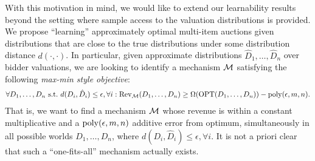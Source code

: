 With this motivation in mind, we would like to extend our learnability results beyond the setting where sample access to the valuation distributions is provided. We propose ``learning'' approximately optimal multi-item auctions given distributions that are close to the true distributions under some distribution distance $d(\cdot,\cdot)$. In particular, given approximate distributions $\hat{D}_1,\ldots,\hat{D}_n$ over bidder valuations, we are looking to identify a mechanism $\cal M$ satisfying the following {\em max-min style objective}:
\begin{align}\forall {D_1,\ldots,D_n~\text{s.t.}~d(D_i,\hat{D}_i) \le \epsilon, \forall i}: {\rm Rev}_{\cal M}(D_1,\ldots,D_n) \ge \Omega({\rm OPT}(D_1,\ldots,D_n)) -{\rm poly}({\epsilon},m,n). \label{eq:max min goal}
\end{align}
That is, we want to find a mechanism $\cal M$ whose revenue is within a constant multiplicative and a ${\rm poly}({\epsilon},m,n)$ additive error from optimum, simultaneously in all possible worlds $D_1,\ldots,D_n$, where $d(D_i,\hat{D}_i) \le \epsilon, \forall i$. It is not a priori clear that such a ``one-fits-all'' mechanism actually exists. 

